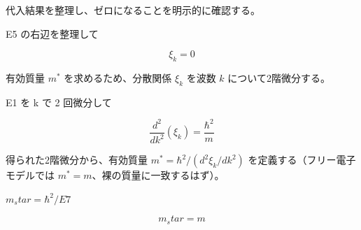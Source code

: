 \documentclass[dvipdfmx,a4paper,11pt]{jsarticle}
\begin{document}
代入結果を整理し、ゼロになることを明示的に確認する。

E5 の右辺を整理して

\begin{equation}
  \xi_k = 0
  \label{eq:E6}
\end{equation}

有効質量 $m^*$ を求めるため、分散関係 $\xi_k$ を波数 $k$ について2階微分する。

E1 を k で 2 回微分して

\begin{equation}
  \frac{d^{2}}{dk^{2}}\left(\xi_k\right) = \frac{\hbar^{2}}{m}
  \label{eq:E7}
\end{equation}

得られた2階微分から、有効質量 $m^*=\hbar^2/(d^2\xi_k/dk^2)$ を定義する（フリー電子モデルでは $m^*=m$、裸の質量に一致するはず）。

$m_star = \hbar^2 / E7$

\begin{equation}
  m_star = m
  \label{eq:E8}
\end{equation}
\end{document}

